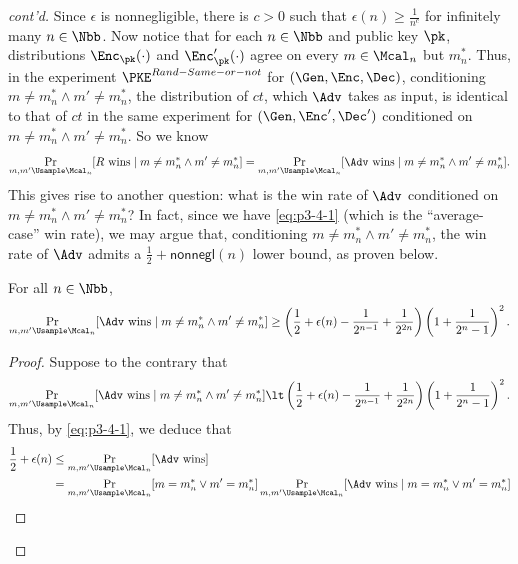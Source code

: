 \begin{answer}[iv]
\begin{proof}[cont'd]
        Since $\epsilon$ is nonnegligible, there is $c\gt 0$ such that $\epsilon(n) \ge \frac{1}{n^c}$ for infinitely many $n\in\Nbb$.
        Now notice that for each $n\in\Nbb$ and public key $\pk$, distributions  $\Enc_\pk(\cdot)$ and $\Enc'_\pk(\cdot)$ agree on every $m\in \Mcal_n$ but $m^\ast_n$. 
        Thus, in the experiment $\PKE^{Rand-Same-or-not}$ for $(\Gen, \Enc, \Dec)$, conditioning $m\neq m^\ast_n\land m'\neq m^\ast_n$, the distribution of $ct$, which $\Adv$ takes as input, is identical to that of $ct$ in the same experiment for $(\Gen, \Enc', \Dec')$ conditioned on $m\neq m^\ast_n\land m'\neq m^\ast_n$. So we know
        \begin{equation}\label{eq:p3-4-2}
            \Pr_{m,m'\Usample\Mcal_n}[R \textrm{ wins} \mid m\neq m^\ast_n\land m'\neq m^\ast_n]
            =\Pr_{m,m'\Usample\Mcal_n}[\Adv \textrm{ wins} \mid  m\neq m^\ast_n\land m'\neq m^\ast_n].
        \end{equation}
        This gives rise to another question: what is the win rate of $\Adv$ conditioned on  $m\neq m^\ast_n\land m'\neq m^\ast_n$? In fact, since we have \eqref{eq:p3-4-1} (which is the ``average-case'' win rate), we may argue that, conditioning $m\neq m^\ast_n\land m'\neq m^\ast_n$, the win rate of $\Adv$ admits a $\frac{1}{2}+\mathsf{nonnegl}(n)$ lower bound, as proven below.
        \begin{observation}\label{obs:p3-4-1}
            For all $n\in\Nbb$,
            \[
                \Pr_{m,m'\Usample\Mcal_n}[\Adv \textrm{ wins}\mid m\neq m^\ast_n\land m'\neq m^\ast_n] \ge \left(\frac{1}{2}+\epsilon(n)-\frac{1}{2^{n-1}}+\frac{1}{2^{2n}}\right)\left(1+\frac{1}{2^n -1}\right) ^2.
            \]
        \end{observation}
        \begin{proof}
            Suppose to the contrary that
            \[
                \Pr_{m,m'\Usample\Mcal_n}[\Adv \textrm{ wins}\mid m\neq m^\ast_n\land m'\neq m^\ast_n] \lt \left(\frac{1}{2}+\epsilon(n)-\frac{1}{2^{n-1}}+\frac{1}{2^{2n}}\right)\left(1+\frac{1}{2^n -1}\right)^2.
            \]
            Thus, by \eqref{eq:p3-4-1}, we deduce that
            \begin{align*}
                \frac{1}{2}+\epsilon(n)
                &\le  \Pr_{m,m'\Usample\Mcal_n}[\Adv \textrm{ wins}]\\
                &= \Pr_{m,m'\Usample\Mcal_n}[m=m^\ast_n\lor m'=m^\ast_n]\Pr_{m,m'\Usample\Mcal_n}[\Adv \textrm{ wins}\mid m=m^\ast_n\lor m'=m^\ast_n]\\

\end{align*}
\end{proof}
\end{proof}
\end{answer}

